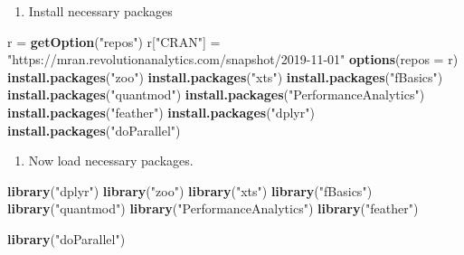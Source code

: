 \documentclass[
]{article}
\newenvironment{Shaded}{\begin{snugshade}}{\end{snugshade}}
\newcommand{\DataTypeTok}[1]{\textcolor[rgb]{0.13,0.29,0.53}{#1}}
\newcommand{\KeywordTok}[1]{\textcolor[rgb]{0.13,0.29,0.53}{\textbf{#1}}}
\newcommand{\NormalTok}[1]{#1}
\newcommand{\StringTok}[1]{\textcolor[rgb]{0.31,0.60,0.02}{#1}}
\providecommand{\tightlist}{%
  \setlength{\itemsep}{0pt}\setlength{\parskip}{0pt}}
\begin{document}
\begin{enumerate}
\def\labelenumi{\arabic{enumi}.}
\tightlist
\item
  Install necessary packages
\end{enumerate}

\begin{Shaded}
\begin{Highlighting}[]
\NormalTok{r =}\StringTok{ }\KeywordTok{getOption}\NormalTok{(}\StringTok{"repos"}\NormalTok{)}
\NormalTok{r[}\StringTok{"CRAN"}\NormalTok{] =}\StringTok{ "https://mran.revolutionanalytics.com/snapshot/2019-11-01"}
\KeywordTok{options}\NormalTok{(}\DataTypeTok{repos =}\NormalTok{ r)}
\KeywordTok{install.packages}\NormalTok{(}\StringTok{"zoo"}\NormalTok{)}
\KeywordTok{install.packages}\NormalTok{(}\StringTok{"xts"}\NormalTok{)}
\KeywordTok{install.packages}\NormalTok{(}\StringTok{"fBasics"}\NormalTok{)}
\KeywordTok{install.packages}\NormalTok{(}\StringTok{"quantmod"}\NormalTok{)}
\KeywordTok{install.packages}\NormalTok{(}\StringTok{"PerformanceAnalytics"}\NormalTok{)}
\KeywordTok{install.packages}\NormalTok{(}\StringTok{"feather"}\NormalTok{)}
\KeywordTok{install.packages}\NormalTok{(}\StringTok{"dplyr"}\NormalTok{)}
\KeywordTok{install.packages}\NormalTok{(}\StringTok{"doParallel"}\NormalTok{)}
\end{Highlighting}
\end{Shaded}

\begin{enumerate}
\def\labelenumi{\arabic{enumi}.}
\setcounter{enumi}{1}
\tightlist
\item
  Now load necessary packages.
\end{enumerate}

\begin{Shaded}
\begin{Highlighting}[]
\KeywordTok{library}\NormalTok{(}\StringTok{"dplyr"}\NormalTok{)}
\KeywordTok{library}\NormalTok{(}\StringTok{"zoo"}\NormalTok{)}
\KeywordTok{library}\NormalTok{(}\StringTok{"xts"}\NormalTok{)}
\KeywordTok{library}\NormalTok{(}\StringTok{"fBasics"}\NormalTok{)}
\KeywordTok{library}\NormalTok{(}\StringTok{"quantmod"}\NormalTok{)}
\KeywordTok{library}\NormalTok{(}\StringTok{"PerformanceAnalytics"}\NormalTok{)}
\KeywordTok{library}\NormalTok{(}\StringTok{"feather"}\NormalTok{)}

\KeywordTok{library}\NormalTok{(}\StringTok{"doParallel"}\NormalTok{)}
\end{Highlighting}
\end{Shaded}
\end{document}
